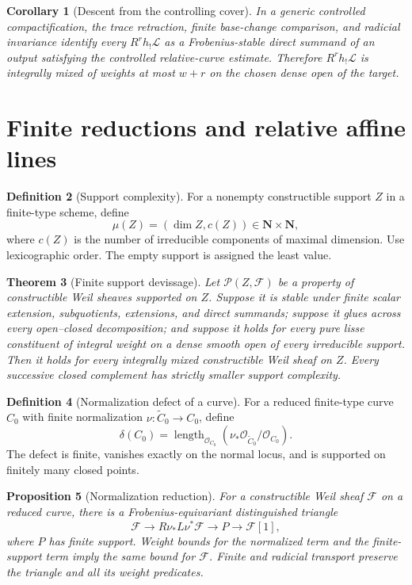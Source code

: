 \documentclass[10pt]{article}
\newtheorem{theorem}{Theorem}[section]
\newtheorem{proposition}[theorem]{Proposition}
\newtheorem{corollary}[theorem]{Corollary}
\theoremstyle{definition}
\newtheorem{definition}[theorem]{Definition}
\begin{document}
\begin{corollary}[Descent from the controlling cover]
In a generic controlled compactification, the trace retraction, finite
base-change comparison, and radicial invariance identify every
\(R^rh_!\mathcal L\) as a Frobenius-stable direct summand of an output
satisfying the controlled relative-curve estimate.  Therefore
\(R^rh_!\mathcal L\) is integrally mixed of weights at most \(w+r\) on the
chosen dense open of the target.
\end{corollary}

\section{Finite reductions and relative affine lines}

\begin{definition}[Support complexity]
For a nonempty constructible support \(Z\) in a finite-type scheme, define
\[
              \mu(Z)=(\dim Z,c(Z))\in\mathbf N\times\mathbf N,
\]
where \(c(Z)\) is the number of irreducible components of maximal dimension.
Use lexicographic order.  The empty support is assigned the least value.
\end{definition}

\begin{theorem}[Finite support devissage]
Let \(\mathcal P(Z,\mathcal F)\) be a property of constructible Weil
sheaves supported on \(Z\).  Suppose it is stable under finite scalar
extension, subquotients, extensions, and direct summands; suppose it glues
across every open--closed decomposition; and suppose it holds for every
pure lisse constituent of integral weight on a dense smooth open of every
irreducible support.  Then it holds for every integrally mixed
constructible Weil sheaf on \(Z\).  Every successive closed complement has
strictly smaller support complexity.
\end{theorem}

\begin{definition}[Normalization defect of a curve]
For a reduced finite-type curve \(C_0\) with finite normalization
\(\nu:\widetilde C_0\to C_0\), define
\[
 \delta(C_0)=\operatorname{length}_{\mathcal O_{C_0}}
      (\nu_*\mathcal O_{\widetilde C_0}/\mathcal O_{C_0}).
\]
The defect is finite, vanishes exactly on the normal locus, and is supported
on finitely many closed points.
\end{definition}

\begin{proposition}[Normalization reduction]
For a constructible Weil sheaf \(\mathcal F\) on a reduced curve, there is
a Frobenius-equivariant distinguished triangle
\[
 \mathcal F\longrightarrow R\nu_*L\nu^*\mathcal F
 \longrightarrow P\longrightarrow\mathcal F[1],
\]
where \(P\) has finite support.  Weight bounds for the normalized term and
the finite-support term imply the same bound for \(\mathcal F\).  Finite
and radicial transport preserve the triangle and all its weight predicates.
\end{proposition}
\end{document}
